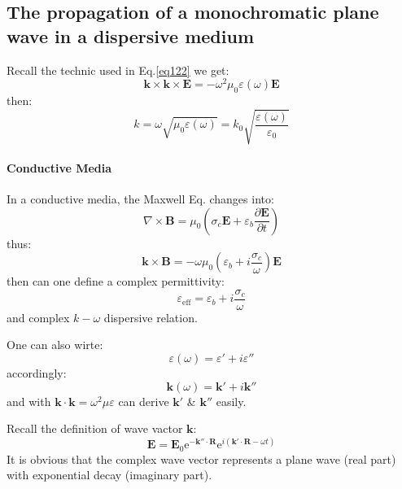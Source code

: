 \documentclass[11pt,a4paper,oneside]{book}
\begin{document}
\subsection{The propagation of a monochromatic plane wave in a dispersive medium}
Recall the technic used in Eq.\ref{eq122} we get:\begin{equation}
	\mathbf{k}\times\mathbf{k}\times\mathbf{E}=-\omega^2\mu_0\varepsilon (\omega) \mathbf{E}
\end{equation}
then:\begin{equation}
	k=\omega\sqrt{\mu_0\varepsilon(\omega)}=k_0\sqrt{\frac{\varepsilon(\omega)}{\varepsilon_0}}
\end{equation}
\paragraph{Conductive Media} In a conductive media, the Maxwell Eq. changes into:\begin{equation}
	\nabla\times\mathbf{B}=\mu_0\left( \sigma_c\mathbf{E}+\varepsilon_b\frac{\partial \mathbf{E}}{\partial t} \right)
\end{equation}
thus:\begin{equation}
	\mathbf{k}\times\mathbf{B}=-\omega\mu_0\left( \varepsilon_b+i\frac{\sigma_c}{\omega} \right)\mathbf{E}
\end{equation}
then can one define a complex permittivity:\begin{equation}
	\varepsilon_\text{eff} = \varepsilon_b+i\frac{\sigma_c}{\omega}
\end{equation}
and complex $k-\omega$ dispersive relation.

One can also wirte:\begin{equation}
	\varepsilon(\omega)=\varepsilon'+i\varepsilon''
\end{equation} accordingly:\begin{equation}
	\mathbf{k}(\omega)=\mathbf{k}'+i\mathbf{k}''
\end{equation} and with $\mathbf{k}\cdot\mathbf{k}=\omega^2\mu\varepsilon$ can derive $\mathbf{k}'$ \& $\mathbf{k}''$ easily.

Recall the definition of wave vactor $\mathbf{k}$:\begin{equation}
	\mathbf{E}=\mathbf{E}_0\text{e}^{-\mathbf{k}''\cdot\mathbf{R}}\text{e}^{i(\mathbf{k}'\cdot\mathbf{R}-\omega t)}
\end{equation}
It is obvious that the complex wave vector represents a plane wave (real part) with exponential decay (imaginary part).
\end{document}
